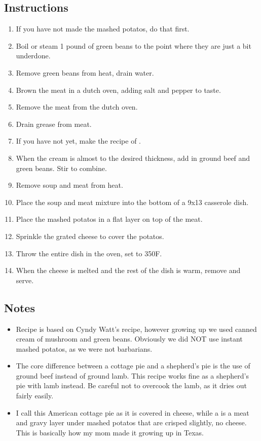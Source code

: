 \begin{multicols}{2}
\subsection*{Instructions}
\begin{enumerate}
    \item If you have not made the mashed potatos, do that first.
    \item Boil or steam 1 pound of green beans to the point where they are just a bit underdone.
    \item Remove green beans from heat, drain water.
    \item Brown the meat in a dutch oven, adding salt and pepper to taste.
    \item Remove the meat from the dutch oven.
    \item Drain grease from meat.
    \item If you have not yet, make the recipe of .
    \item When the cream is almost to the desired thickness, add in ground beef and green beans. Stir to combine.
    \item Remove soup and meat from heat.
    \item Place the soup and meat mixture into the bottom of a 9x13 casserole dish.
    \item Place the mashed potatos in a flat layer on top of the meat.
    \item Sprinkle the grated cheese to cover the potatos.
    \item Throw the entire dish in the oven, set to 350F.
    \item When the cheese is melted and the rest of the dish is warm, remove and serve.
\end{enumerate}

\subsection*{Notes}
\begin{itemize}
    \item Recipe is based on Cyndy Watt's recipe, however growing up we used canned cream of mushroom and green beans. Obviously we did NOT use instant mashed potatos, as we were not barbarians.
    \item The core difference between a cottage pie and a shepherd's pie is the use of ground beef instead of ground lamb. This recipe works fine as a shepherd's pie with lamb instead. Be careful not to overcook the lamb, as it dries out fairly easily.
    \item I call this American cottage pie as it is covered in cheese, while a  is a meat and gravy layer under mashed potatos that are crisped slightly, no cheese. This is basically how my mom made it growing up in Texas.
\end{itemize}
\end{multicols}
\clearpage